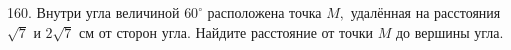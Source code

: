 160. Внутри угла величиной $60^\circ$ расположена точка $M,$ удалённая на расстояния $\sqrt{7}$ и $2\sqrt{7}$ см от
сторон угла. Найдите расстояние от точки $M$ до вершины угла.\\
